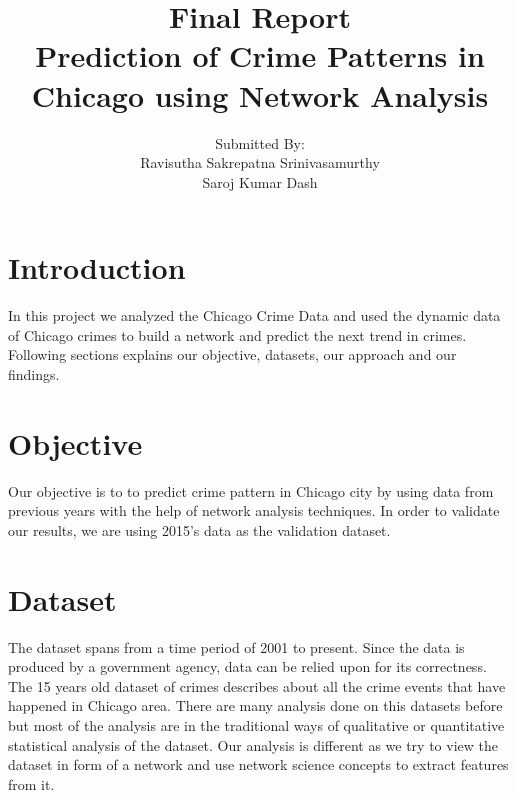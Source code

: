 \documentclass{article}
\title{Final Report\\
Prediction of Crime Patterns in Chicago using Network Analysis\vfill{}}
\author{Submitted By:\\Ravisutha Sakrepatna Srinivasamurthy\\
						Saroj Kumar Dash}
\begin{document}
	\begin{titlepage}
		\maketitle
		\end{titlepage}
	
\newpage

\tableofcontents

\newpage	


\section{Introduction}
In this project we analyzed the Chicago Crime Data \cite{data} and used the dynamic data of Chicago crimes to build a network and predict the next trend in crimes. Following sections explains our objective, datasets, our approach and our findings.

\section{Objective}
Our objective is to to predict crime pattern in Chicago city by using data from previous years with the help of network analysis techniques. In order to validate our results, we are using 2015's data as the validation dataset.

\section{Dataset}
The dataset spans from a time period of 2001 to present. Since the data is produced by a government agency, data can be relied upon for its correctness. The 15 years old dataset of crimes describes about all the crime events that have happened in Chicago area. There are many analysis done on this datasets before but most of the analysis are in the traditional ways of qualitative or quantitative statistical analysis of the dataset. Our analysis is different as we try to view the dataset in form of a network and use network science concepts to extract features from it. 
\end{document}
